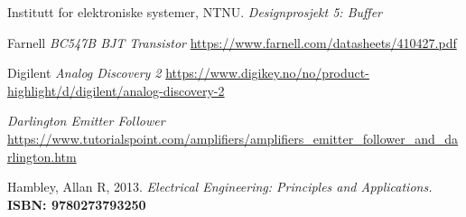     Institutt for elektroniske systemer, NTNU.
    \emph{Designprosjekt 5: Buffer}

    Farnell
    \emph{BC547B BJT Transistor}
    \url{https://www.farnell.com/datasheets/410427.pdf}

    Digilent
    \emph{Analog Discovery 2}
    \url{https://www.digikey.no/no/product-highlight/d/digilent/analog-discovery-2}

    \emph{Darlington Emitter Follower}
    \url{https://www.tutorialspoint.com/amplifiers/amplifiers_emitter_follower_and_darlington.htm}

    Hambley, Allan R, 2013.
    \emph{Electrical Engineering: Principles and Applications. }
    \textbf{ISBN: 9780273793250}

